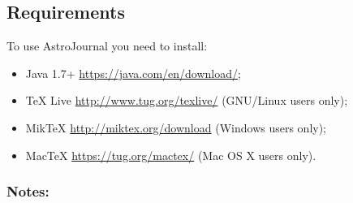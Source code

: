 \subsection{Requirements}
\label{subsec:Requirements}
To use AstroJournal you need to install:
\begin{itemize}
 \item Java 1.7+ \href{https://java.com/en/download/}{https://java.com/en/download/};
 \item TeX Live \href{http://www.tug.org/texlive/}{http://www.tug.org/texlive/} (GNU/Linux users only);
 \item MikTeX \href{http://miktex.org/download}{http://miktex.org/download} (Windows users only);
 \item MacTeX \href{https://tug.org/mactex/}{https://tug.org/mactex/} (Mac OS X users only).
\end{itemize}


\subsubsection{Notes:}
\label{subsubsec:Requirements Notes}

